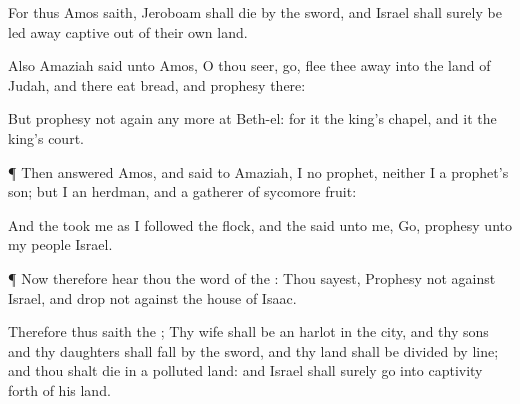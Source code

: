 {For thus
Amos
saith,
Jeroboam shall
die by the
sword, and
Israel shall
surely be led away
captive out of their own
land.

Also
Amaziah
said unto
Amos, O thou
seer,
go, flee thee
away into the
land of
Judah, and there
eat
bread, and
prophesy there:

But
prophesy not
again any more at
Beth-el: for it
{} the
king’s
chapel, and it
{} the
king’s
court.


\par }{\PP {}¶ Then
answered
Amos, and
said to
Amaziah, I
{} no
prophet, neither
{} I a
prophet’s
son; but I
{} an
herdman, and a
gatherer of sycomore
fruit:

And the
{}
took me as I
followed the
flock, and the
{}
said unto me,
Go,
prophesy unto my
people
Israel.


\par }{\PP {}¶ Now therefore
hear thou the
word of the
{}: Thou
sayest,
Prophesy not against
Israel, and
drop not
{} against the
house of
Isaac.

Therefore thus
saith the
{}; Thy
wife shall be an
harlot in the
city, and thy
sons and thy
daughters shall
fall by the
sword, and thy
land shall be
divided by
line; and thou shalt
die
in a
polluted
land: and
Israel shall
surely go into
captivity forth of his
land.




\par }
